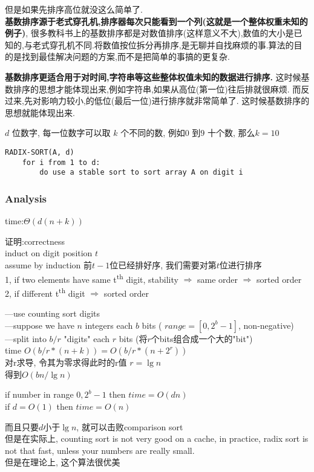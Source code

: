 \documentclass{article}
\begin{document}
但是如果先排序高位就没这么简单了.\\
\textbf{基数排序源于老式穿孔机,排序器每次只能看到一个列(这就是一个整体权重未知的例子)},
很多教科书上的基数排序都是对数值排序(这样意义不大),数值的大小是已知的,与老式穿孔机不同.将数值按位拆分再排序,是无聊并自找麻烦的事.算法的目的是找到最佳解决问题的方案,而不是把简单的事搞的更复杂.

\textbf{基数排序更适合用于对时间,字符串等这些整体权值未知的数据进行排序.}
这时候基数排序的思想才能体现出来,例如字符串,如果从高位(第一位)往后排就很麻烦.
而反过来,先对影响力较小,的低位(最后一位)进行排序就非常简单了.
这时候基数排序的思想就能体现出来.

$d$ 位数字, 每一位数字可以取 $k$ 个不同的数, 例如$0$ 到$9$ 十个数, 那么$k=10$
\begin{verbatim}
RADIX-SORT(A, d)
    for i from 1 to d:
        do use a stable sort to sort array A on digit i
\end{verbatim}

\subsubsection{Analysis}
time:$\Theta(d(n+k))$

证明:correctness\\
induct on digit position $t$\\
assume by induction 前$t-1$位已经排好序, 我们需要对第$t$位进行排序\\
1, if two elements have same t\textsuperscript{th} digit, stability $\Rightarrow$ same order $\Rightarrow$ sorted order\\
2, if different t\textsuperscript{th} digit $\Rightarrow$ sorted order

---use counting sort digits\\
---suppose we have $n$ integers each $b$ bits ( $range=[0,2^b-1]$, non-negative)\\
---split into $b/r$ "digits" each $r$ bits (将$r$个bits组合成一个大的"bit")\\
time $O(b/r*(n+k))=O(b/r*(n+2^r))$\\
对r求导, 令其为零求得此时的r值 $r=\lg n$\\
得到$O(bn/\lg n )$

if number in range $0,2^b-1$ then $time = O(dn)$\\
if  $d=O(1)$ then $time=O(n)$

而且只要$d$小于$\lg n$, 就可以击败comparison sort\\
但是在实际上, counting sort is not very good on a cache, in practice, radix sort is not that fast, unless your numbers are really small.\\
但是在理论上, 这个算法很优美
\end{document}
